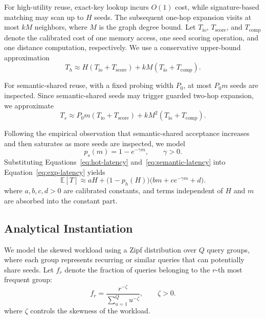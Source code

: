 For high-utility reuse, exact-key lookup incurs $O(1)$ cost, while signature-based matching may scan up to $H$ seeds. The subsequent one-hop expansion visits at most $kM$ neighbors, where $M$ is the graph degree bound.
Let $T_{\mathrm{io}}$, $T_{\mathrm{score}}$, and $T_{\mathrm{comp}}$ denote the calibrated cost of one memory access, one seed scoring operation, and one distance computation, respectively. We use a conservative upper-bound approximation
\begin{equation}
T_h \approx H (T_{\mathrm{io}}+T_{\mathrm{score}}) + kM(T_{\mathrm{io}}+T_{\mathrm{comp}}).
\label{eq:hot-latency}
\end{equation}

For semantic-shared reuse, with a fixed probing width $P_0$, at most $P_0m$ seeds are inspected.
Since semantic-shared seeds may trigger guarded two-hop expansion, we approximate
\begin{equation}
T_s \approx P_0m(T_{\mathrm{io}}+T_{\mathrm{score}})+ kM^2 (T_{\mathrm{io}}+T_{\mathrm{comp}}).
\label{eq:semantic-latency}
\end{equation}

Following the empirical observation that semantic-shared acceptance increases and then saturates as more seeds are inspected, we model
\begin{equation}
p_s(m)=1-e^{-\gamma m}, \qquad \gamma>0.
\end{equation}
Substituting Equations~\eqref{eq:hot-latency} and~\eqref{eq:semantic-latency} into Equation~\eqref{eq:exp-latency} yields
\begin{equation}
\mathbb{E}[T]
\approx
aH+\bigl(1-p_h(H)\bigr)\bigl(bm+ce^{-\gamma m}+d\bigr).
\label{eq:compact-objective}
\end{equation}
where $a,b,c,d>0$ are calibrated constants, and terms independent of $H$ and $m$ are absorbed into the constant part.

\subsection{Analytical Instantiation}
We model the skewed workload using a Zipf distribution over $Q$ query groups, where each group represents recurring or similar queries that can potentially share seeds.
Let $f_r$ denote the fraction of queries belonging to the $r$-th most frequent group:
\begin{equation}
f_r=\frac{r^{-\zeta}}{\sum_{u=1}^{Q}u^{-\zeta}}, \qquad \zeta>0.
\end{equation}
where $\zeta$ controls the skewness of the workload.

